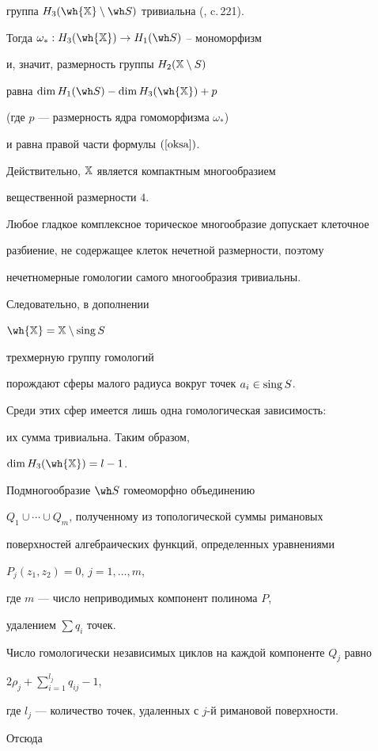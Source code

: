 \begin{pf}
группа $H_3(\wh{\Bbb X}\setminus \wh S )$ тривиальна (\cite{SS}, c.\,221).


Тогда $\omega_* : H_3(\wh{\Bbb X}) \rightarrow H_1(\wh S)$ -- мономорфизм


и, значит, размерность группы $H_2(\Bbb X\setminus S)$


равна $\dim H_1(\wh S) - \dim H_3(\wh{\Bbb X}) + p$


(где $p$ --- размерность ядра гомоморфизма $\omega_*$)


и равна правой части формулы $(\ref{oksa})$.


Действительно, $\Bbb X$ является компактным многообразием


вещественной размерности $4$.


Любое гладкое комплексное торическое многообразие допускает клеточное


разбиение, не содержащее клеток нечетной размерности, поэтому


нечетномерные гомологии самого многообразия тривиальны.


Следовательно, в дополнении


$\wh{\Bbb X}=\Bbb X \setminus \sing S$


трехмерную группу гомологий


порождают сферы малого радиуса вокруг точек $a_i \in \operatorname{sing} S$.


Среди этих сфер имеется лишь одна гомологическая зависимость:


их сумма тривиальна. Таким образом,


$\dim H_3 (\wh{\Bbb X})=l-1$.


Подмногообразие $\wh S$ гомеоморфно объединению


$Q_1\cup\dotsb\cup Q_m$, полученному из топологической суммы римановых


поверхностей алгебраических функций, определенных уравнениями


$P_j\left (z_1,z_2\right )=0$, $j=1, \dotsc,m$,


где $m$ --- число неприводимых компонент полинома $P$,


удалением $\sum q_i$ точек.


Число гомологически независимых циклов на каждой компоненте $Q_j$ равно


$2\rho_j+\sum\limits_{i=1}^{l_j} q_{ij}-1$,


где $l_j$ --- количество точек, удаленных с $j$-й римановой поверхности.


Отсюда



\end{pf}
